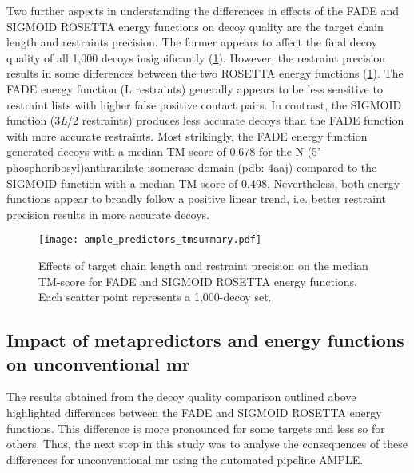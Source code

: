Two further aspects in understanding the differences in effects of the FADE and SIGMOID ROSETTA energy functions on decoy quality are the target chain length and restraints precision. The former appears to affect the final decoy quality of all 1,000 decoys insignificantly (\cref{fig:ample_predictor_tmsummary}). However, the restraint precision results in some differences between the two ROSETTA energy functions (\cref{fig:ample_predictor_tmsummary}). The FADE energy function (L restraints) generally appears to be less sensitive to restraint lists with higher false positive contact pairs.  In contrast, the SIGMOID function  (3\textit{L}/2 restraints) produces less accurate decoys than the FADE function with more accurate restraints. Most strikingly, the FADE energy function generated decoys with a median TM-score of 0.678 for the N-(5'-phosphoribosyl)anthranilate isomerase domain (\gls{pdb}: 4aaj) compared to the SIGMOID function with a median TM-score of 0.498. Nevertheless, both energy functions appear to broadly follow a positive linear trend, i.e. better restraint precision results in more accurate decoys.

\begin{figure}[H]
    \centering
    \texttt{[image: ample\_predictors\_tmsummary.pdf]}
    \caption{Effects of target chain length and restraint precision on the median TM-score for FADE and SIGMOID ROSETTA energy functions. Each scatter point represents a 1,000-decoy set.}
    \label{fig:ample_predictor_tmsummary}
\end{figure}

\subsection{Impact of metapredictors and energy functions on unconventional \acrlong{mr}}
The results obtained from the decoy quality comparison outlined above highlighted differences between the FADE and SIGMOID ROSETTA energy functions. This difference is more pronounced for some targets and less so for others. Thus, the next step in this study was to analyse the consequences  of these differences for unconventional \gls{mr} using the automated pipeline AMPLE.

